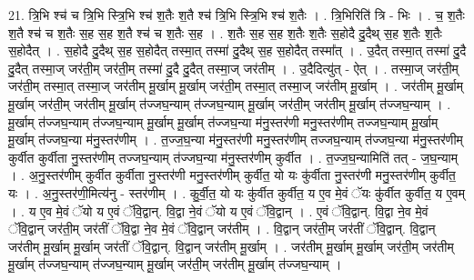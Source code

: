 \documentclass[17pt]{extarticle}
\begin{document}
21. त्रि॒भि श्च॑ च त्रि॒भि स्त्रि॒भि श्च॑ श॒तैः श॒तै श्च॑ त्रि॒भि स्त्रि॒भि श्च॑ श॒तैः । . त्रि॒भिरिति॑ त्रि - भिः । . च॒ श॒तैः श॒तै श्च॑ च श॒तैः स॒ह स॒ह श॒तै श्च॑ च श॒तैः स॒ह । . श॒तैः स॒ह स॒ह श॒तैः श॒तैः स॒होदै दु॒दैथ् स॒ह श॒तैः श॒तैः स॒होदैत् । . स॒होदै दु॒दैथ् स॒ह स॒होदैत् तस्मा॒त् तस्मा॑ दु॒दैथ् स॒ह स॒होदैत् तस्मा᳚त् । . उ॒दैत् तस्मा॒त् तस्मा॑ दु॒दै दु॒दैत् तस्मा॒ज् जर॑ती॒म् जर॑ती॒म् तस्मा॑ दु॒दै दु॒दैत् तस्मा॒ज् जर॑तीम् । . उ॒दैदित्यु॑त् - ऐत् । . तस्मा॒ज् जर॑ती॒म् जर॑ती॒म् तस्मा॒त् तस्मा॒ज् जर॑तीम् मू॒र्खाम् मू॒र्खाम् जर॑ती॒म् तस्मा॒त् तस्मा॒ज् जर॑तीम् मू॒र्खाम् । . जर॑तीम् मू॒र्खाम् मू॒र्खाम् जर॑ती॒म् जर॑तीम् मू॒र्खाम् त॑ज्जघ॒न्याम् त॑ज्जघ॒न्याम् मू॒र्खाम् जर॑ती॒म् जर॑तीम् मू॒र्खाम् त॑ज्जघ॒न्याम् । . मू॒र्खाम् त॑ज्जघ॒न्याम् त॑ज्जघ॒न्याम् मू॒र्खाम् मू॒र्खाम् त॑ज्जघ॒न्या म॑नु॒स्तर॑णी मनु॒स्तर॑णीम् तज्जघ॒न्याम् मू॒र्खाम् मू॒र्खाम् त॑ज्जघ॒न्या म॑नु॒स्तर॑णीम् । . त॒ज्ज॒घ॒न्या म॑नु॒स्तर॑णी मनु॒स्तर॑णीम् तज्जघ॒न्याम् त॑ज्जघ॒न्या म॑नु॒स्तर॑णीम् कुर्वीत कुर्वीता नु॒स्तर॑णीम् तज्जघ॒न्याम् त॑ज्जघ॒न्या म॑नु॒स्तर॑णीम् कुर्वीत । . त॒ज्ज॒घ॒न्यामिति॑ तत् - ज॒घ॒न्याम् । . अ॒नु॒स्तर॑णीम् कुर्वीत कुर्वीता नु॒स्तर॑णी मनु॒स्तर॑णीम् कुर्वीत॒ यो यः कु॑र्वीता नु॒स्तर॑णी मनु॒स्तर॑णीम् कुर्वीत॒ यः । . अ॒नु॒स्तर॑णी॒मित्य॑नु - स्तर॑णीम् । . कु॒र्वी॒त॒ यो यः कु॑र्वीत कुर्वीत॒ य ए॒व मे॒वं ॅयः कु॑र्वीत कुर्वीत॒ य ए॒वम् । . य ए॒व मे॒वं ॅयो य ए॒वं ॅवि॒द्वान्. वि॒द्वा ने॒वं ॅयो य ए॒वं ॅवि॒द्वान् । . ए॒वं ॅवि॒द्वान्. वि॒द्वा ने॒व मे॒वं ॅवि॒द्वान् जर॑ती॒म् जर॑तीं ॅवि॒द्वा ने॒व मे॒वं ॅवि॒द्वान् जर॑तीम् । . वि॒द्वान् जर॑ती॒म् जर॑तीं ॅवि॒द्वान्. वि॒द्वान् जर॑तीम् मू॒र्खाम् मू॒र्खाम् जर॑तीं ॅवि॒द्वान्. वि॒द्वान् जर॑तीम् मू॒र्खाम् । . जर॑तीम् मू॒र्खाम् मू॒र्खाम् जर॑ती॒म् जर॑तीम् मू॒र्खाम् त॑ज्जघ॒न्याम् त॑ज्जघ॒न्याम् मू॒र्खाम् जर॑ती॒म् जर॑तीम् मू॒र्खाम् त॑ज्जघ॒न्याम् । \newline
\end{document}
